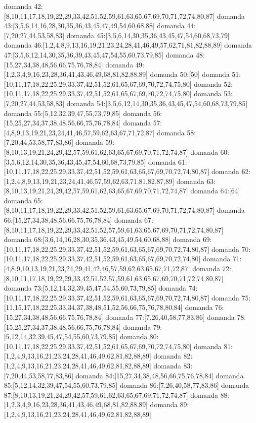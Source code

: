 domanda 42:[8,10,11,17,18,19,22,29,33,42,51,52,59,61,63,65,67,69,70,71,72,74,80,87]
domanda 43:[3,5,6,14,16,28,30,35,36,43,45,47,49,54,60,68,88]
domanda 44:[7,20,27,44,53,58,83]
domanda 45:[3,5,6,14,30,35,36,43,45,47,54,60,68,73,79]
domanda 46:[1,2,4,8,9,13,16,19,21,23,24,28,41,46,49,57,62,71,81,82,88,89]
domanda 47:[3,5,6,12,14,30,35,36,39,43,45,47,54,55,60,73,79,85]
domanda 48:[15,27,34,38,48,56,66,75,76,78,84]
domanda 49:[1,2,3,4,9,16,23,28,36,41,43,46,49,68,81,82,88,89]
domanda 50:[50]
domanda 51:[10,11,17,18,22,25,29,33,37,42,51,52,61,65,67,69,70,72,74,75,80]
domanda 52:[10,11,17,18,22,25,29,33,37,42,51,52,61,65,67,69,70,72,74,75,80]
domanda 53:[7,20,27,44,53,58,83]
domanda 54:[3,5,6,12,14,30,35,36,43,45,47,54,60,68,73,79,85]
domanda 55:[5,12,32,39,47,55,73,79,85]
domanda 56:[15,25,27,34,37,38,48,56,66,75,76,78,84]
domanda 57:[4,8,9,13,19,21,23,24,41,46,57,59,62,63,67,71,72,87]
domanda 58:[7,20,44,53,58,77,83,86]
domanda 59:[8,10,13,19,21,24,29,42,57,59,61,62,63,65,67,69,70,71,72,74,87]
domanda 60:[3,5,6,12,14,30,35,36,43,45,47,54,60,68,73,79,85]
domanda 61:[10,11,17,18,22,25,29,33,37,42,51,52,59,61,63,65,67,69,70,72,74,80,87]
domanda 62:[1,2,4,8,9,13,19,21,23,24,41,46,57,59,62,63,71,81,82,87,89]
domanda 63:[8,10,13,19,21,24,29,42,57,59,61,62,63,65,67,69,70,71,72,74,87]
domanda 64:[64]
domanda 65:[8,10,11,17,18,19,22,29,33,42,51,52,59,61,63,65,67,69,70,71,72,74,80,87]
domanda 66:[15,27,34,38,48,56,66,75,76,78,84]
domanda 67:[8,10,11,17,18,19,22,29,33,42,51,52,57,59,61,63,65,67,69,70,71,72,74,80,87]
domanda 68:[3,6,14,16,28,30,35,36,43,45,49,54,60,68,88]
domanda 69:[10,11,17,18,22,25,29,33,37,42,51,52,59,61,63,65,67,69,70,72,74,80,87]
domanda 70:[10,11,17,18,22,25,29,33,37,42,51,52,59,61,63,65,67,69,70,72,74,80]
domanda 71:[4,8,9,10,13,19,21,23,24,29,41,42,46,57,59,62,63,65,67,71,72,87]
domanda 72:[8,10,11,17,18,19,22,29,33,42,51,52,57,59,61,63,65,67,69,70,71,72,74,80,87]
domanda 73:[5,12,14,32,39,45,47,54,55,60,73,79,85]
domanda 74:[10,11,17,18,22,25,29,33,37,42,51,52,59,61,63,65,67,69,70,72,74,80,87]
domanda 75:[11,15,17,18,22,25,33,34,37,38,48,51,52,56,66,75,76,78,80,84]
domanda 76:[15,27,34,38,48,56,66,75,76,78,84]
domanda 77:[7,26,40,58,77,83,86]
domanda 78:[15,25,27,34,37,38,48,56,66,75,76,78,84]
domanda 79:[5,12,14,32,39,45,47,54,55,60,73,79,85]
domanda 80:[10,11,17,18,22,25,29,33,37,42,51,52,61,65,67,69,70,72,74,75,80]
domanda 81:[1,2,4,9,13,16,21,23,24,28,41,46,49,62,81,82,88,89]
domanda 82:[1,2,4,9,13,16,21,23,24,28,41,46,49,62,81,82,88,89]
domanda 83:[7,20,44,53,58,77,83,86]
domanda 84:[15,27,34,38,48,56,66,75,76,78,84]
domanda 85:[5,12,14,32,39,47,54,55,60,73,79,85]
domanda 86:[7,26,40,58,77,83,86]
domanda 87:[8,10,13,19,21,24,29,42,57,59,61,62,63,65,67,69,71,72,74,87]
domanda 88:[1,2,3,4,9,16,23,28,36,41,43,46,49,68,81,82,88,89]
domanda 89:[1,2,4,9,13,16,21,23,24,28,41,46,49,62,81,82,88,89]


